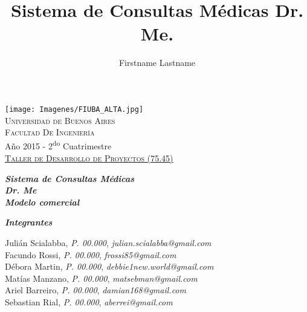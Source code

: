 \documentclass[a4paper,10pt]{article}
\begin{document}
%
%
\pagestyle{fancy}
\renewcommand{\sectionmark}[1]{\markboth{}{\thesection\ \ #1}}
\lhead{}
\chead{}
\rhead{\rightmark}
\lfoot{}
\cfoot{}
\rfoot{\thepage}


%
%

\author{Firstname Lastname}

\begin{titlepage}

\thispagestyle{empty}
\begin{center}
\texttt{[image: Imagenes/FIUBA\_ALTA.jpg]}\\
\large{\textsc{Universidad de Buenos Aires}}\\
\large{\textsc{Facultad De Ingeniería}}\\
\small{Año 2015 - 2\textsuperscript{do} Cuatrimestre}\\
\vspace{1cm}
\Large{\underline{\textsc{Taller de Desarrollo de Proyectos (75.45)}}}
\end{center}



\title{Sistema de Consultas Médicas Dr. Me.}

\begin{center}
\Large{\textit{\bf{Sistema de Consultas Médicas}}}\\
\Large{\textit{\bf{Dr. Me}}}\\
\textit{\bf{Modelo comercial}}
\end{center}

\vspace{1cm}

\raggedright{\Large{\textit{\bf{Integrantes}}}}

\vspace{0.5cm}

\begin{center}
  Julián Scialabba,	\textit{P. 00.000},	\textit{julian.scialabba@gmail.com}		\\
  Facundo Rossi,		\textit{P. 00.000},	\textit{frossi85@gmail.com}		\\
  Débora Martin,		\textit{P. 00.000},	\textit{debbie1new.world@gmail.com}	\\
  Matías Manzano,			\textit{P. 00.000},	\textit{matsebman@gmail.com}		\\
  Ariel Barreiro,		\textit{P. 00.000},	\textit{damian168@gmail.com}		\\
  Sebastian Rial,			\textit{P. 00.000},	\textit{aberrei@gmail.com}		\\
\end{center}

\end{titlepage}
\end{document}
